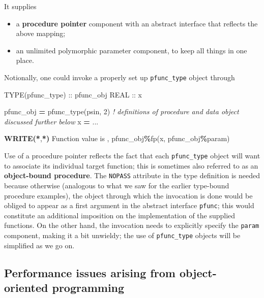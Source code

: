 \documentclass[
  paper=a4,
  ,captions=tableheading
]{scrartcl}
\newenvironment{Shaded}{\begin{snugshade}}{\end{snugshade}}
\newcommand{\CommentTok}[1]{\textcolor[rgb]{0.56,0.35,0.01}{\textit{#1}}}
\newcommand{\DataTypeTok}[1]{\textcolor[rgb]{0.13,0.29,0.53}{#1}}
\newcommand{\DecValTok}[1]{\textcolor[rgb]{0.00,0.00,0.81}{#1}}
\newcommand{\FunctionTok}[1]{\textcolor[rgb]{0.13,0.29,0.53}{\textbf{#1}}}
\newcommand{\KeywordTok}[1]{\textcolor[rgb]{0.13,0.29,0.53}{\textbf{#1}}}
\newcommand{\NormalTok}[1]{#1}
\newcommand{\OperatorTok}[1]{\textcolor[rgb]{0.81,0.36,0.00}{\textbf{#1}}}
\newcommand{\StringTok}[1]{\textcolor[rgb]{0.31,0.60,0.02}{#1}}
\providecommand{\tightlist}{%
  \setlength{\itemsep}{0pt}\setlength{\parskip}{0pt}}
\begin{document}
It supplies

\begin{itemize}
\tightlist
\item
  a \textbf{procedure pointer} component with an abstract interface that
  reflects the above mapping;
\item
  an unlimited polymorphic parameter component, to keep all things in
  one place.
\end{itemize}

Notionally, one could invoke a properly set up \texttt{pfunc\_type}
object through

\begin{Shaded}
\begin{Highlighting}[]
\DataTypeTok{TYPE(pfunc\_type)} \DataTypeTok{::}\NormalTok{ pfunc\_obj}
\DataTypeTok{REAL} \DataTypeTok{::}\NormalTok{ x}

\NormalTok{pfunc\_obj }\KeywordTok{=}\NormalTok{ pfunc\_type(psin, }\DecValTok{2}\NormalTok{)}
\CommentTok{! definitions of procedure and data object discussed further below}
\NormalTok{x }\KeywordTok{=}\NormalTok{ ...}

\FunctionTok{WRITE(*}\NormalTok{,}\FunctionTok{*)} \StringTok{\textquotesingle{}Function value is \textquotesingle{}}\NormalTok{, pfunc\_obj}\OperatorTok{\%}\NormalTok{fp(x, pfunc\_obj}\OperatorTok{\%}\NormalTok{param)}
\end{Highlighting}
\end{Shaded}

Use of a procedure pointer reflects the fact that each
\texttt{pfunc\_type} object will want to associate its individual target
function; this is sometimes also referred to as an \textbf{object-bound
procedure}. The \texttt{NOPASS} attribute in the type definition is
needed because otherwise (analogous to what we saw for the earlier
type-bound procedure examples), the object through which the invocation
is done would be obliged to appear as a first argument in the abstract
interface \texttt{pfunc}; this would constitute an additional imposition
on the implementation of the supplied functions. On the other hand, the
invocation needs to explicitly specify the \texttt{param} component,
making it a bit unwieldy; the use of \texttt{pfunc\_type} objects will
be simplified as we go on.

\subsection{Performance issues arising from object-oriented
programming}\label{performance-issues-arising-from-object-oriented-programming}
\end{document}

